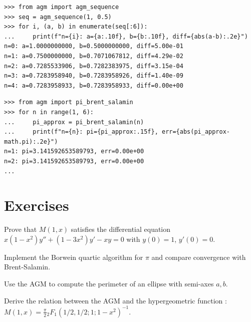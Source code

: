 \begin{example}
\begin{lstlisting}[style=python]
>>> from agm import agm_sequence
>>> seq = agm_sequence(1, 0.5)
>>> for i, (a, b) in enumerate(seq[:6]):
...     print(f"n={i}: a={a:.10f}, b={b:.10f}, diff={abs(a-b):.2e}")
n=0: a=1.0000000000, b=0.5000000000, diff=5.00e-01
n=1: a=0.7500000000, b=0.7071067812, diff=4.29e-02
n=2: a=0.7285533906, b=0.7282383975, diff=3.15e-04
n=3: a=0.7283958940, b=0.7283958926, diff=1.40e-09
n=4: a=0.7283958933, b=0.7283958933, diff=0.00e+00
\end{lstlisting}
\end{example}

\begin{example}[Computing $\pi$]
\begin{lstlisting}[style=python]
>>> from agm import pi_brent_salamin
>>> for n in range(1, 6):
...     pi_approx = pi_brent_salamin(n)
...     print(f"n={n}: pi={pi_approx:.15f}, err={abs(pi_approx-math.pi):.2e}")
n=1: pi=3.141592653589793, err=0.00e+00
n=2: pi=3.141592653589793, err=0.00e+00
...
\end{lstlisting}
\end{example}

\section{Exercises}

\begin{exercise}
Prove that $M(1, x)$ satisfies the differential equation
$x(1-x^2) y'' + (1-3x^2) y' - x y = 0$ with $y(0)=1$, $y'(0)=0$.
\end{exercise}

\begin{exercise}
Implement the Borwein quartic algorithm for $\pi$ and compare convergence with Brent-Salamin.
\end{exercise}

\begin{exercise}
Use the AGM to compute the perimeter of an ellipse with semi-axes $a, b$.
\end{exercise}

\begin{exercise}
Derive the relation between the AGM and the hypergeometric function :
$M(1, x) = \frac{\pi}{2} {}_2F_1(1/2, 1/2; 1; 1-x^2)^{-1}$.
\end{exercise}



